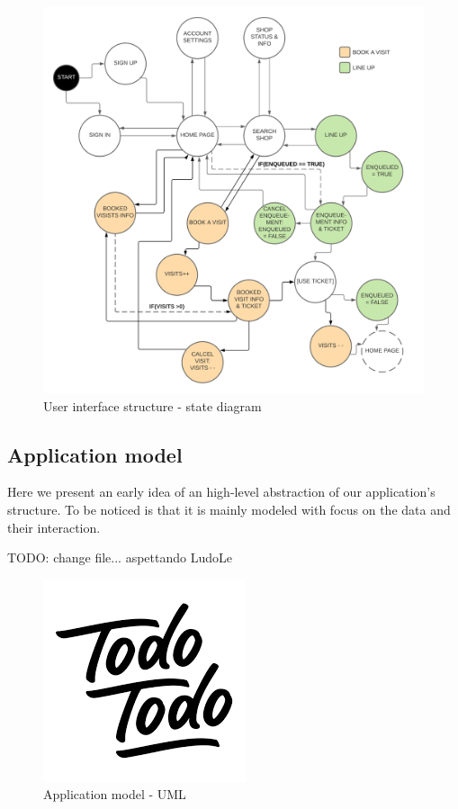 \begin{figure}[h!]
    \centering
    \includegraphics[width=\textwidth]{Images/statediagrams/userinterface.png}
    \caption{\label{fig:userinterfacestructure}{User interface structure - state diagram}}
\end{figure}

\FloatBarrier

\subsection{Application model}
\label{subsect:applicationstructure}

Here we present an early idea of an high-level abstraction of our application's structure. To be noticed is that it is mainly modeled with focus on the data and their interaction.

TODO: change file... aspettando LudoLe
\begin{figure}[h!]
    \centering
    \includegraphics[width=\textwidth]{Images/uml/todo.png}
    \caption{\label{fig:applicationmodel}{Application model - UML}}
\end{figure}